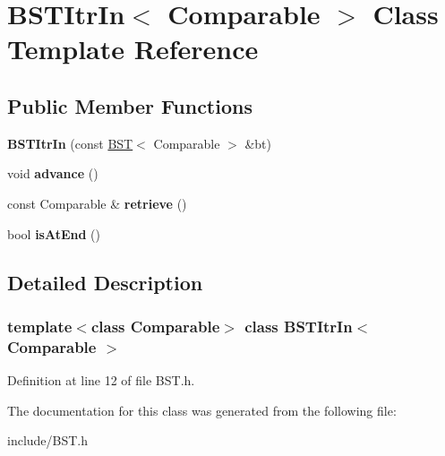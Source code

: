 \hypertarget{classBSTItrIn}{}\section{B\+S\+T\+Itr\+In$<$ Comparable $>$ Class Template Reference}
\label{classBSTItrIn}
\subsection*{Public Member Functions}
\begin{DoxyCompactItemize}
\item 
\mbox{\label{classBSTItrIn_ac836e2f560fed9cc7ef8e5431a2836cc}} 
{\bfseries B\+S\+T\+Itr\+In} (const \hyperlink{classBST}{B\+ST}$<$ Comparable $>$ \&bt)
\item 
\mbox{\label{classBSTItrIn_ac772d3ebbac748c5f8cf9bc659f2e32c}} 
void {\bfseries advance} ()
\item 
\mbox{\label{classBSTItrIn_a434375a2d263bf132ab3c4ac878af8ef}} 
const Comparable \& {\bfseries retrieve} ()
\item 
\mbox{\label{classBSTItrIn_a6f9a43217862c263a9bf15b9a08b889a}} 
bool {\bfseries is\+At\+End} ()
\end{DoxyCompactItemize}


\subsection{Detailed Description}
\subsubsection*{template$<$class Comparable$>$\newline
class B\+S\+T\+Itr\+In$<$ Comparable $>$}



Definition at line 12 of file B\+S\+T.\+h.



The documentation for this class was generated from the following file\+:\begin{DoxyCompactItemize}
\item 
include/B\+S\+T.\+h\end{DoxyCompactItemize}
